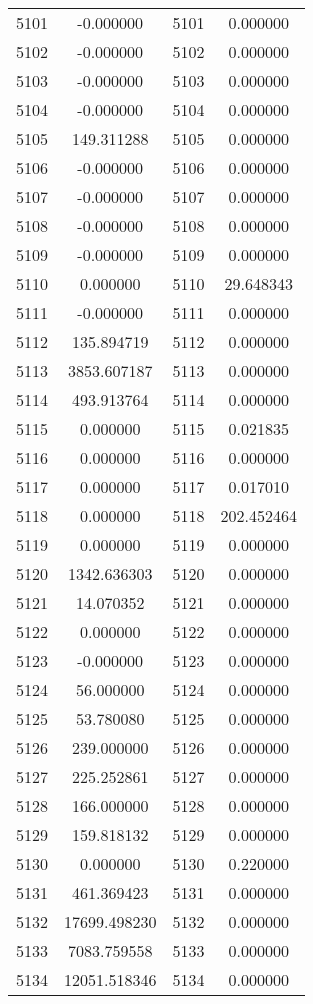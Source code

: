 \documentclass[12pt]{article}
\begin{document}
\begin{longtable}{@{}cccc@{}}
5101 & -0.000000 & 5101 & 0.000000 \\
5102 & -0.000000 & 5102 & 0.000000 \\
5103 & -0.000000 & 5103 & 0.000000 \\
5104 & -0.000000 & 5104 & 0.000000 \\
5105 & 149.311288 & 5105 & 0.000000 \\
5106 & -0.000000 & 5106 & 0.000000 \\
5107 & -0.000000 & 5107 & 0.000000 \\
5108 & -0.000000 & 5108 & 0.000000 \\
5109 & -0.000000 & 5109 & 0.000000 \\
5110 & 0.000000 & 5110 & 29.648343 \\
5111 & -0.000000 & 5111 & 0.000000 \\
5112 & 135.894719 & 5112 & 0.000000 \\
5113 & 3853.607187 & 5113 & 0.000000 \\
5114 & 493.913764 & 5114 & 0.000000 \\
5115 & 0.000000 & 5115 & 0.021835 \\
5116 & 0.000000 & 5116 & 0.000000 \\
5117 & 0.000000 & 5117 & 0.017010 \\
5118 & 0.000000 & 5118 & 202.452464 \\
5119 & 0.000000 & 5119 & 0.000000 \\
5120 & 1342.636303 & 5120 & 0.000000 \\
5121 & 14.070352 & 5121 & 0.000000 \\
5122 & 0.000000 & 5122 & 0.000000 \\
5123 & -0.000000 & 5123 & 0.000000 \\
5124 & 56.000000 & 5124 & 0.000000 \\
5125 & 53.780080 & 5125 & 0.000000 \\
5126 & 239.000000 & 5126 & 0.000000 \\
5127 & 225.252861 & 5127 & 0.000000 \\
5128 & 166.000000 & 5128 & 0.000000 \\
5129 & 159.818132 & 5129 & 0.000000 \\
5130 & 0.000000 & 5130 & 0.220000 \\
5131 & 461.369423 & 5131 & 0.000000 \\
5132 & 17699.498230 & 5132 & 0.000000 \\
5133 & 7083.759558 & 5133 & 0.000000 \\
5134 & 12051.518346 & 5134 & 0.000000 \\

\end{longtable}
\end{document}
